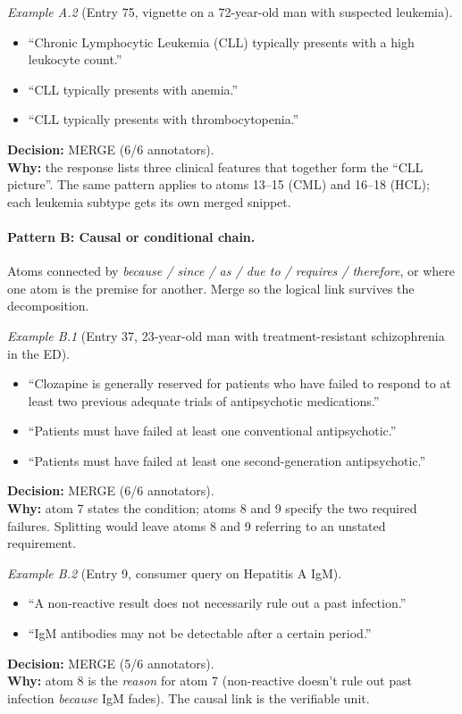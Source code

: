 \documentclass{article}
\begin{document}
\medskip
\noindent\textit{Example A.2} (Entry 75, vignette on a 72-year-old man with suspected leukemia).
\begin{itemize}[leftmargin=1.8em,labelsep=0.5em,itemsep=2pt,topsep=3pt]
    \item[\textit{atom 10:}] ``Chronic Lymphocytic Leukemia (CLL) typically presents with a high leukocyte count.''
    \item[\textit{atom 11:}] ``CLL typically presents with anemia.''
    \item[\textit{atom 12:}] ``CLL typically presents with thrombocytopenia.''
\end{itemize}
\noindent\textbf{Decision:} MERGE (6/6 annotators). \\
\noindent\textbf{Why:} the response lists three clinical features that together form the ``CLL picture''. The same pattern applies to atoms 13--15 (CML) and 16--18 (HCL); each leukemia subtype gets its own merged snippet.

\paragraph{Pattern B: Causal or conditional chain.}
Atoms connected by \textit{because / since / as / due to / requires / therefore}, or where one atom is the premise for another. Merge so the logical link survives the decomposition.

\medskip
\noindent\textit{Example B.1} (Entry 37, 23-year-old man with treatment-resistant schizophrenia in the ED).
\begin{itemize}[leftmargin=1.8em,labelsep=0.5em,itemsep=2pt,topsep=3pt]
    \item[\textit{atom 7:}] ``Clozapine is generally reserved for patients who have failed to respond to at least two previous adequate trials of antipsychotic medications.''
    \item[\textit{atom 8:}] ``Patients must have failed at least one conventional antipsychotic.''
    \item[\textit{atom 9:}] ``Patients must have failed at least one second-generation antipsychotic.''
\end{itemize}
\noindent\textbf{Decision:} MERGE (6/6 annotators). \\
\noindent\textbf{Why:} atom 7 states the condition; atoms 8 and 9 specify the two required failures. Splitting would leave atoms 8 and 9 referring to an unstated requirement.

\medskip
\noindent\textit{Example B.2} (Entry 9, consumer query on Hepatitis A IgM).
\begin{itemize}[leftmargin=1.8em,labelsep=0.5em,itemsep=2pt,topsep=3pt]
    \item[\textit{atom 7:}] ``A non-reactive result does not necessarily rule out a past infection.''
    \item[\textit{atom 8:}] ``IgM antibodies may not be detectable after a certain period.''
\end{itemize}
\noindent\textbf{Decision:} MERGE (5/6 annotators). \\
\noindent\textbf{Why:} atom 8 is the \textit{reason} for atom 7 (non-reactive doesn't rule out past infection \textit{because} IgM fades). The causal link is the verifiable unit.
\end{document}
